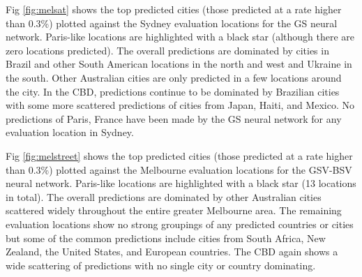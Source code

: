 \documentclass[10pt,letterpaper]{article}
\begin{document}
Fig \ref{fig:melsat} shows the top predicted cities (those predicted at a rate higher than 0.3\%) plotted against the Sydney evaluation locations for the GS neural network. Paris-like locations are highlighted with a black star (although there are zero locations predicted). The overall predictions are dominated by cities in Brazil and other South American locations in the north and west and Ukraine in the south. Other Australian cities are only predicted in a few locations around the city. In the CBD, predictions continue to be dominated by Brazilian cities with some more scattered predictions of cities from Japan, Haiti, and Mexico. No predictions of Paris, France have been made by the GS neural network for any evaluation location in Sydney.

Fig \ref{fig:melstreet} shows the top predicted cities (those predicted at a rate higher than 0.3\%) plotted against the Melbourne evaluation locations for the GSV-BSV neural network. Paris-like locations are highlighted with a black star (13 locations in total). The overall predictions are dominated by other Australian cities scattered widely throughout the entire greater Melbourne area. The remaining evaluation locations show no strong groupings of any predicted countries or cities but some of the common predictions include cities from South Africa, New Zealand, the United States, and European countries. The CBD again shows a wide scattering of predictions with no single city or country dominating.
\end{document}
